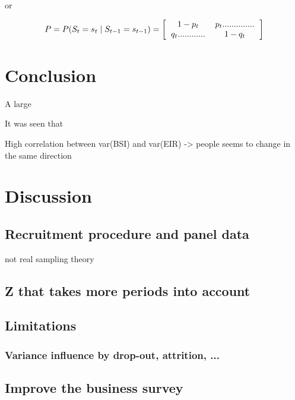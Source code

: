 \documentclass[12pt,a4paper,oneside]{book}
\begin{document}
or 

\begin{equation}
    P = P(S_t = s_t \mid S_{t-1} = s_{t-1}) = 
\left[ \begin{tabular}{c c}
            $1 - p_{t}$	& $p_{t} ..............$ \\ 
            $q_{t} ............$	& $1 - q_{t}$ \\ 
\end{tabular} \right]
\end{equation}






\chapter{Conclusion}

A large 

It was seen that


High correlation between var(BSI) and var(EIR) -> people seems to change in the same direction


\chapter{Discussion}

\section{Recruitment procedure and panel data}
not real sampling theory



\section{Z that takes more periods into account}



\section{Limitations}

\subsection*{Variance influence by drop-out, attrition, ...}

\section{Improve the business survey}
\end{document}
